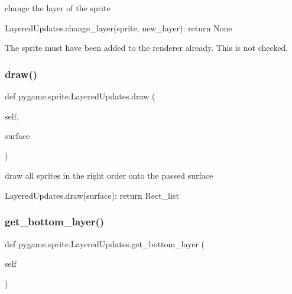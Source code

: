 \begin{DoxyVerb}change the layer of the sprite

LayeredUpdates.change_layer(sprite, new_layer): return None

The sprite must have been added to the renderer already. This is not
checked.\end{DoxyVerb}
 \mbox{\label{classpygame_1_1sprite_1_1_layered_updates_ac6343a93db51cf00cea51a406aef9573}} 
\subsubsection{\texorpdfstring{draw()}{draw()}}
{\footnotesize\ttfamily def pygame.\+sprite.\+Layered\+Updates.\+draw (\begin{DoxyParamCaption}\item[{}]{self,  }\item[{}]{surface }\end{DoxyParamCaption})}

\begin{DoxyVerb}draw all sprites in the right order onto the passed surface

LayeredUpdates.draw(surface): return Rect_list\end{DoxyVerb}
 \mbox{\label{classpygame_1_1sprite_1_1_layered_updates_a51f426f8ba99b455db930e772a073731}} 
\subsubsection{\texorpdfstring{get\+\_\+bottom\+\_\+layer()}{get\_bottom\_layer()}}
{\footnotesize\ttfamily def pygame.\+sprite.\+Layered\+Updates.\+get\+\_\+bottom\+\_\+layer (\begin{DoxyParamCaption}\item[{}]{self }\end{DoxyParamCaption})}

